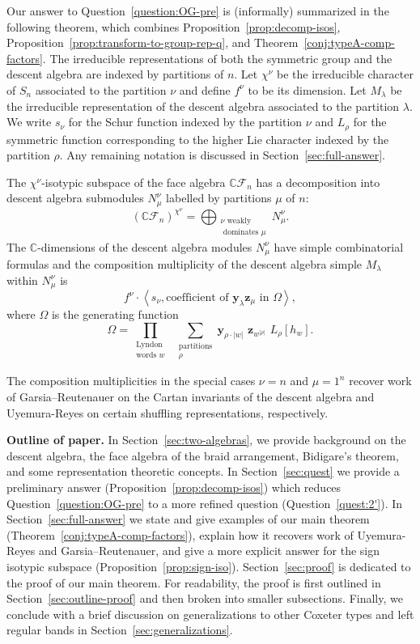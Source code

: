 \documentclass[ALCO, Unicode]{cedram}
\def\C{{\mathbb{C}}}
\begin{document}
 Our answer to Question~\ref{question:OG-pre} is (informally) summarized in the following theorem, which combines Proposition~\ref{prop:decomp-isos},  Proposition~\ref{prop:transform-to-group-rep-q}, and Theorem~\ref{conj:typeA-comp-factors}. The irreducible representations of both the symmetric group and the descent algebra are indexed by partitions of $n.$ Let $\chi^\nu$ be the irreducible character of $S_n$ associated to the partition $\nu$ and define $f^\nu$ to be its dimension. Let $M_\lambda$ be the irreducible representation of the descent algebra associated to the partition $\lambda.$ We write $s_\nu$ for the Schur function indexed by the partition $\nu$ and $L_\rho$ for the symmetric function corresponding to the higher Lie character indexed by the partition $\rho.$ Any remaining notation is discussed in Section~\ref{sec:full-answer}. 
\begin{thm}\label{thm:informal-main}
    The $\chi^\nu$-isotypic subspace of the face algebra $\C \mathcal{F}_n$ has a decomposition into descent algebra submodules $N_{\mu}^\nu$  labelled by partitions $\mu$ of $n:$ \[ \left(\C \mathcal{F}_n\right)^{\chi^{\nu}} = \bigoplus_{\substack{\nu \text{ weakly}\\ \text{ dominates }\mu}} N_{\mu}^\nu.\] The $\C$-dimensions of the descent algebra modules $N_{\mu}^{\nu}$ have simple combinatorial formulas and the composition multiplicity of the descent algebra simple $M_\lambda$ within $N_{\mu}^{\nu}$ is \[f^\nu \cdot \left\langle s_\nu, \text{coefficient of }\mathbf{y}_\lambda \mathbf{z}_\mu \text{ in } \Omega\right\rangle,\] where $\Omega$ is the generating function
    \[\Omega = \prod_{\substack{\text{Lyndon}\\\text{words } w}} \,\,
    \sum_{\substack{\text{partitions}\\ \rho}}\mathbf{y}_{\rho \cdot |w|} \, \, \mathbf{z}_{w^{|\rho|}} \,\, L_\rho [h_w].\]
\end{thm}
The composition multiplicities in the special cases $\nu = n$ and $\mu = 1^n$ recover work of Garsia--Reutenauer on the Cartan invariants of the descent algebra and Uyemura-Reyes on certain shuffling representations, respectively. 

\vspace{.5cm}
\noindent \textbf{Outline of paper.}  In Section~\ref{sec:two-algebras}, we provide background on the descent algebra, the face algebra of the braid arrangement, Bidigare's theorem, and some representation theoretic concepts. In Section~\ref{sec:quest} we provide a preliminary answer (Proposition~\ref{prop:decomp-isos}) which reduces Question~\ref{question:OG-pre} to a more refined question (Question~\ref{quest:2'}). In Section~\ref{sec:full-answer} we state and give examples of our main theorem (Theorem~\ref{conj:typeA-comp-factors}), explain how it recovers work of Uyemura-Reyes and Garsia--Reutenauer, and give a more explicit answer for the sign isotypic subspace (Proposition~\ref{prop:sign-iso}). Section~\ref{sec:proof} is dedicated to the proof of our main theorem. For readability, the proof is first outlined in Section~\ref{sec:outline-proof} and then broken into smaller subsections. Finally, we conclude with a brief discussion on generalizations to other Coxeter types and left regular bands in Section~\ref{sec:generalizations}.
\end{document}
